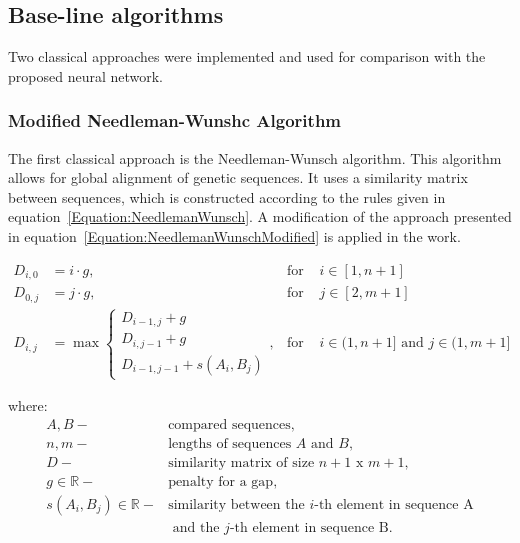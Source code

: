 \documentclass[pdflatex,sn-vancouver-num]{sn-jnl}%
\begin{document}
        \subsection{Base-line algorithms}


            Two classical approaches were implemented and used for comparison with the proposed neural network.

            \subsubsection{Modified Needleman-Wunshc Algorithm}
                The first classical approach is the Needleman-Wunsch algorithm. This algorithm allows for global alignment of genetic sequences. It uses a similarity matrix between sequences, which is constructed according to the rules given in equation~\eqref{Equation:NeedlemanWunsch}. A modification of the approach presented in equation~\eqref{Equation:NeedlemanWunschModified} is applied in the work.

                \begin{equation}
                    \begin{aligned}
                        D_{i,0} &= i \cdot g, & \text{for } & i \in [1, n + 1] \\
                        D_{0,j} &= j \cdot g, & \text{for } & j \in [2, m + 1] \\
                        D_{i,j} &= \max
                        \begin{cases}
                            D_{i - 1, j} + g \\
                            D_{i, j - 1} + g \\
                            D_{i - 1, j - 1} + s(A_i, B_j)
                        \end{cases}, & \text{for } & i \in (1, n + 1] \text{ and } j \in (1, m + 1]
                    \end{aligned}
                    \label{Equation:NeedlemanWunsch}
                \end{equation}

                where:
                \begin{align*}
                    A, B -& \text{compared sequences}, \\
                    n, m -& \text{lengths of sequences } A \text{ and } B, \\
                    D -& \text{similarity matrix of size } n + 1 \text{ x } m + 1, \\
                    g \in \mathbb{R} -& \text{penalty for a gap}, \\
                    s(A_i, B_j) \in \mathbb{R} -& \text{similarity between the } i\text{-th element in sequence A} \\ 
                                                & \text{ and the } j\text{-th element in sequence B}.
                \end{align*}
\end{document}
